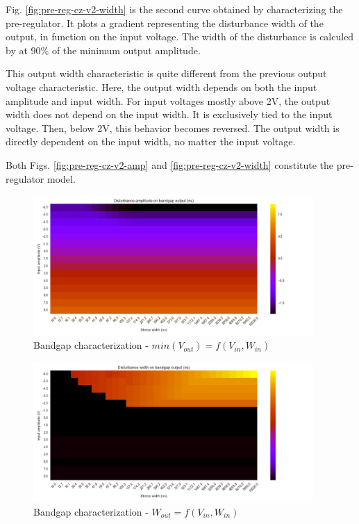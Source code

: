 Fig. \ref{fig:pre-reg-cz-v2-width} is the second curve obtained by characterizing the pre-regulator.
It plots a gradient representing the disturbance width of the output, in function on the input voltage.
The width of the disturbance is calculed by at 90\% of the minimum output amplitude.

This output width characteristic is quite different from the previous output voltage characteristic.
Here, the output width depends on both the input amplitude and input width.
For input voltages mostly above 2V, the output width does not depend on the input width.
It is exclusively tied to the input voltage.
Then, below 2V, this behavior becomes reversed. The output width is directly dependent on the input width,
no matter the input voltage.

Both Figs. \ref{fig:pre-reg-cz-v2-amp} and \ref{fig:pre-reg-cz-v2-width} constitute the pre-regulator model.

\begin{figure}[!htb]
  \centering
  \includegraphics[width=0.95\textwidth]{src/4/figures/bandgap_cz_V2_amplitude.png}
  \caption{Bandgap characterization - $min(V_{out}) = f(V_{in}, W_{in})$}
  \label{fig:bandgap-cz-v2-amp}
\end{figure}

\begin{figure}[!htb]
  \centering
  \includegraphics[width=0.95\textwidth]{src/4/figures/bandgap_cz_V2_width.png}
  \caption{Bandgap characterization - $W_{out} = f(V_{in}, W_{in})$}
  \label{fig:bandgap-cz-v2-width}
\end{figure}

